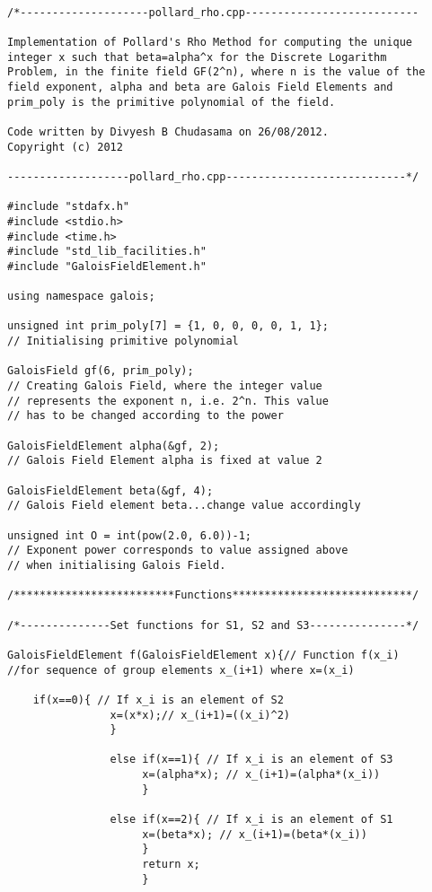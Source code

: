 \documentclass[iwp,first]{luthesis}
\begin{document}
\begin{verbatim}

/*--------------------pollard_rho.cpp---------------------------

Implementation of Pollard's Rho Method for computing the unique 
integer x such that beta=alpha^x for the Discrete Logarithm 
Problem, in the finite field GF(2^n), where n is the value of the 
field exponent, alpha and beta are Galois Field Elements and 
prim_poly is the primitive polynomial of the field.

Code written by Divyesh B Chudasama on 26/08/2012.
Copyright (c) 2012

-------------------pollard_rho.cpp----------------------------*/

#include "stdafx.h"
#include <stdio.h>
#include <time.h>
#include "std_lib_facilities.h"
#include "GaloisFieldElement.h"

using namespace galois;

unsigned int prim_poly[7] = {1, 0, 0, 0, 0, 1, 1}; 
// Initialising primitive polynomial

GaloisField gf(6, prim_poly); 
// Creating Galois Field, where the integer value 
// represents the exponent n, i.e. 2^n. This value
// has to be changed according to the power

GaloisFieldElement alpha(&gf, 2); 
// Galois Field Element alpha is fixed at value 2

GaloisFieldElement beta(&gf, 4); 
// Galois Field element beta...change value accordingly

unsigned int O = int(pow(2.0, 6.0))-1; 
// Exponent power corresponds to value assigned above
// when initialising Galois Field.

/*************************Functions****************************/

/*--------------Set functions for S1, S2 and S3---------------*/

GaloisFieldElement f(GaloisFieldElement x){// Function f(x_i) 
//for sequence of group elements x_(i+1) where x=(x_i)
    
    if(x==0){ // If x_i is an element of S2
                x=(x*x);// x_(i+1)=((x_i)^2)
                }
                
                else if(x==1){ // If x_i is an element of S3
                     x=(alpha*x); // x_(i+1)=(alpha*(x_i))
                     }
                     
                else if(x==2){ // If x_i is an element of S1
                     x=(beta*x); // x_(i+1)=(beta*(x_i))
                     }
                     return x;
                     }


\end{verbatim}
\end{document}
